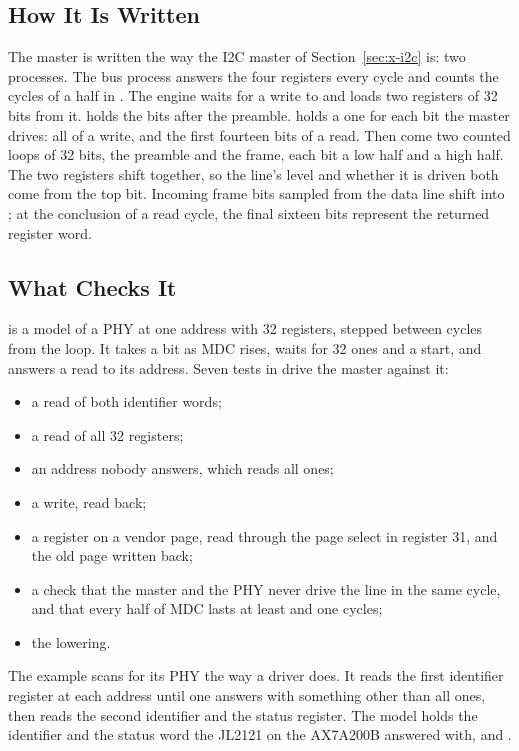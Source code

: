 \subsection{How It Is Written}

The master is written the way the I2C master of
Section~\ref{sec:x-i2c} is: two processes. The bus process answers the
four registers every cycle and counts the cycles of a half in
. The engine waits for a write to  and loads two
registers of 32 bits from it.  holds the bits after the
preamble.  holds a one for each bit the master drives: all
of a write, and the first fourteen bits of a read. Then come two
counted loops of 32 bits, the preamble and the frame, each bit a low
half and a high half. The two registers shift together, so the line's
level and whether it is driven both come from the top bit. Incoming frame
bits sampled from the data line shift into ; at the conclusion of a
read cycle, the final sixteen bits represent the returned register word.

\subsection{What Checks It}

 is a model of a PHY at one address with 32 registers,
stepped between cycles from the loop. It takes a bit as MDC rises,
waits for 32 ones and a start, and answers a read to its address.
Seven tests in  drive the master
against it:
\begin{itemize}
\item a read of both identifier words;
\item a read of all 32 registers;
\item an address nobody answers, which reads all ones;
\item a write, read back;
\item a register on a vendor page, read through the page select in
register 31, and the old page written back;
\item a check that the master and the PHY never drive the line in the
same cycle, and that every half of MDC lasts at least  and
one cycles;
\item the lowering.
\end{itemize}

The example scans for its PHY the way a driver does. It reads the
first identifier register at each address until one answers with
something other than all ones, then reads the second identifier and
the status register. The model holds the identifier and the status
word the JL2121 on the AX7A200B answered with,  and
.


